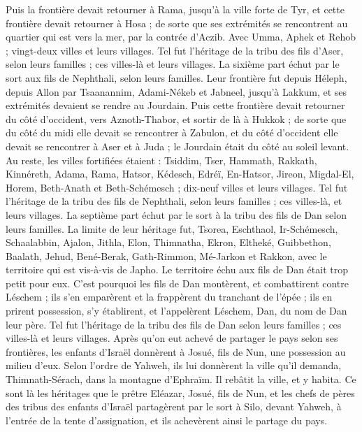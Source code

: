 \begin{multicols}{2}
Puis la frontière devait retourner à Rama, jusqu'à la ville forte de Tyr, et cette frontière devait retourner à Hosa ; de sorte que ses extrémités se rencontrent au quartier qui est vers la mer, par la contrée d'Aczib.
Avec Umma, Aphek et Rehob ; vingt-deux villes et leurs villages.
Tel fut l'héritage de la tribu des fils d'Aser, selon leurs familles ; ces villes-là et leurs villages.
La sixième part échut par le sort aux fils de Nephthali, selon leurs familles.
Leur frontière fut depuis Héleph, depuis Allon par Tsaanannim, Adami-Nékeb et Jabneel, jusqu'à Lakkum, et ses extrémités devaient se rendre au Jourdain.
Puis cette frontière devait retourner du côté d'occident, vers Aznoth-Thabor, et sortir de là à Hukkok ; de sorte que du côté du midi elle devait se rencontrer à Zabulon, et du côté d'occident elle devait se rencontrer à Aser et à Juda ; le Jourdain était du côté au soleil levant.
Au reste, les villes fortifiées étaient : Tsiddim, Tser, Hammath, Rakkath, Kinnéreth,
Adama, Rama, Hatsor,
Kédesch, Edréï, En-Hatsor,
Jireon, Migdal-El, Horem, Beth-Anath et Beth-Schémesch ; dix-neuf villes et leurs villages.
Tel fut l'héritage de la tribu des fils de Nephthali, selon leurs familles ; ces villes-là, et leurs villages.
La septième part échut par le sort à la tribu des fils de Dan selon leurs familles.
La limite de leur héritage fut, Tsorea, Eschthaol, Ir-Schémesch,
Schaalabbin, Ajalon, Jithla,
Elon, Thimnatha, Ekron,
Eltheké, Guibbethon, Baalath,
Jehud, Bené-Berak, Gath-Rimmon,
Mé-Jarkon et Rakkon, avec le territoire qui est vis-à-vis de Japho.
Le territoire échu aux fils de Dan était trop petit pour eux. C'est pourquoi les fils de Dan montèrent, et combattirent contre Léschem ; ils s'en emparèrent et la frappèrent du tranchant de l'épée ; ils en prirent possession, s'y établirent, et l'appelèrent Léschem, Dan, du nom de Dan leur père.
Tel fut l'héritage de la tribu des fils de Dan selon leurs familles ; ces villes-là et leurs villages.
Après qu'on eut achevé de partager le pays selon ses frontières, les enfants d'Israël donnèrent à Josué, fils de Nun, une possession au milieu d'eux.
Selon l'ordre de Yahweh, ils lui donnèrent la ville qu'il demanda, Thimnath-Sérach, dans la montagne d'Ephraïm. Il rebâtit la ville, et y habita.
Ce sont là les héritages que le prêtre Eléazar, Josué, fils de Nun, et les chefs de pères des tribus des enfants d'Israël partagèrent par le sort à Silo, devant Yahweh, à l'entrée de la tente d'assignation, et ils achevèrent ainsi le partage du pays.

\end{multicols}
